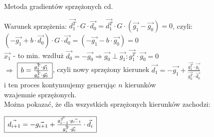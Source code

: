   \begin{frame}{Metoda gradientów sprzężonych cd. }

   \begin{block}{}
	  Warunek sprzężenia: $\vec{d_1^T} \cdot G \cdot \vec{d_0} = \vec{d_1^T} \cdot G \cdot (\vec{g_1} - \vec{g_0}) = 0$, czyli:
	  $(-\vec{g_1} + b \cdot \vec{d_0}) \cdot G \cdot \vec{d_0} = (-\vec{g_1} -b \cdot \vec{g_0}) = 0$
	  \\$\vec{x_1}$ - to min. wzdłuż $\vec{d_0} = -\vec{g_0} \Rightarrow \vec{g_0} \perp \vec{g_1} : \vec{g_1^T} \cdot \vec{g_0} = 0$
	  \smallskip
	  \\$\Rightarrow$
	  $\begin{array}{|c|}
 	   	 \hline
 	   	    b = \frac{\vec{g_1^T} \cdot \vec{g_1}}{\vec{g_0^T} \cdot \vec{g_0}}
 	   	 \\ \hline
	  \end{array}$,
 	  czyli nowy sprzężony kierunek $\vec{d_1} = -\vec{g_1} + \frac{\vec{g_1^T} \cdot \vec{g_1}}{\vec{g_0^T} \cdot \vec{d_0}}$
 	  \medskip
 	  \\i ten proces kontynuujemy generując $n$ kierunków \\ wzajemnie sprzężonych.
 	  \medskip
 	  \\Można pokazać, że dla wszystkich sprzężonych kierunków zachodzi:
 	  \begin{center}
 	  	 $\begin{array}{|c|}
 	   	   \hline
 	   	      \vec{d_{i+1}} = -\vec{g_{i+1}} + \frac{\vec{g_{i-1}^T} \cdot \vec{g_{i-1}}}{\vec{g_{i}^T} \cdot \vec{g_{i}}} \cdot \vec{d_i}
 	   	   \\ \hline
	    \end{array}$
 	  \end{center}
 	\end{block}

  \end{frame}

